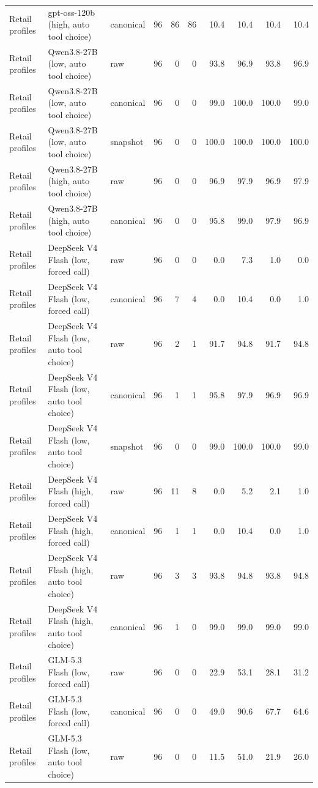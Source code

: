 {\begin{longtable}{lllrrrrrrr}
Retail profiles & gpt-oss-120b (high, auto tool choice) & canonical & 96 & 86 & 86 & 10.4 & 10.4 & 10.4 & 10.4 \\
Retail profiles & Qwen3.8-27B (low, auto tool choice) & raw & 96 & 0 & 0 & 93.8 & 96.9 & 93.8 & 96.9 \\
Retail profiles & Qwen3.8-27B (low, auto tool choice) & canonical & 96 & 0 & 0 & 99.0 & 100.0 & 100.0 & 99.0 \\
Retail profiles & Qwen3.8-27B (low, auto tool choice) & snapshot & 96 & 0 & 0 & 100.0 & 100.0 & 100.0 & 100.0 \\
Retail profiles & Qwen3.8-27B (high, auto tool choice) & raw & 96 & 0 & 0 & 96.9 & 97.9 & 96.9 & 97.9 \\
Retail profiles & Qwen3.8-27B (high, auto tool choice) & canonical & 96 & 0 & 0 & 95.8 & 99.0 & 97.9 & 96.9 \\
Retail profiles & DeepSeek V4 Flash (low, forced call) & raw & 96 & 0 & 0 & 0.0 & 7.3 & 1.0 & 0.0 \\
Retail profiles & DeepSeek V4 Flash (low, forced call) & canonical & 96 & 7 & 4 & 0.0 & 10.4 & 0.0 & 1.0 \\
Retail profiles & DeepSeek V4 Flash (low, auto tool choice) & raw & 96 & 2 & 1 & 91.7 & 94.8 & 91.7 & 94.8 \\
Retail profiles & DeepSeek V4 Flash (low, auto tool choice) & canonical & 96 & 1 & 1 & 95.8 & 97.9 & 96.9 & 96.9 \\
Retail profiles & DeepSeek V4 Flash (low, auto tool choice) & snapshot & 96 & 0 & 0 & 99.0 & 100.0 & 100.0 & 99.0 \\
Retail profiles & DeepSeek V4 Flash (high, forced call) & raw & 96 & 11 & 8 & 0.0 & 5.2 & 2.1 & 1.0 \\
Retail profiles & DeepSeek V4 Flash (high, forced call) & canonical & 96 & 1 & 1 & 0.0 & 10.4 & 0.0 & 1.0 \\
Retail profiles & DeepSeek V4 Flash (high, auto tool choice) & raw & 96 & 3 & 3 & 93.8 & 94.8 & 93.8 & 94.8 \\
Retail profiles & DeepSeek V4 Flash (high, auto tool choice) & canonical & 96 & 1 & 0 & 99.0 & 99.0 & 99.0 & 99.0 \\
Retail profiles & GLM-5.3 Flash (low, forced call) & raw & 96 & 0 & 0 & 22.9 & 53.1 & 28.1 & 31.2 \\
Retail profiles & GLM-5.3 Flash (low, forced call) & canonical & 96 & 0 & 0 & 49.0 & 90.6 & 67.7 & 64.6 \\
Retail profiles & GLM-5.3 Flash (low, auto tool choice) & raw & 96 & 0 & 0 & 11.5 & 51.0 & 21.9 & 26.0 \\

\end{longtable}}
